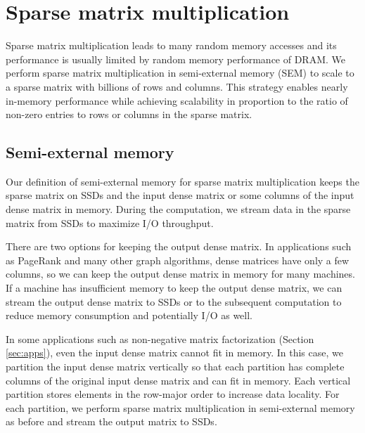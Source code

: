 \section{Sparse matrix multiplication} \label{sec:spmm}
Sparse matrix multiplication leads to many random memory
accesses and its performance is usually limited by random memory performance
of DRAM. We perform sparse matrix multiplication in semi-external memory (SEM)
to scale to a sparse matrix with billions of rows and columns. This strategy enables
nearly in-memory performance while achieving scalability in proportion
to the ratio of non-zero entries to rows or columns in the sparse matrix.

\subsection{Semi-external memory}
Our definition of semi-external memory for sparse matrix multiplication
keeps the sparse matrix on SSDs and the input dense matrix or some columns
of the input dense matrix in memory. During the computation, we stream
data in the sparse matrix from SSDs to maximize I/O throughput.

There are two options for keeping the output dense matrix. In applications
such as PageRank and many other graph
algorithms, dense matrices have only a few columns, so we can keep the output
dense matrix in memory for many machines. If a machine has insufficient
memory to keep the output dense matrix, we can stream the output dense matrix
to SSDs or to the subsequent computation to reduce memory consumption and
potentially I/O as well.

In some applications such as non-negative matrix factorization (Section
\ref{sec:apps}), even the input dense matrix cannot fit in memory. In this case,
we partition the input dense matrix vertically so that each partition has
complete columns of the original input dense matrix and can fit in memory.
Each vertical partition stores elements in the row-major order to increase
data locality. For each partition, we perform sparse matrix multiplication
in semi-external memory as before and stream the output matrix to SSDs.

